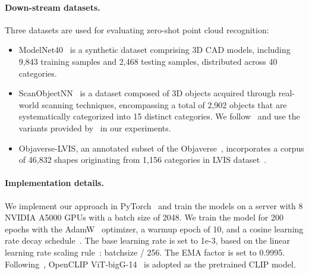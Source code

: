 \documentclass{article} \usepackage{iclr2024_conference,times}
\begin{document}
\paragraph{Down-stream datasets.}
Three datasets are used for evaluating zero-shot point cloud recognition:
\begin{itemize}[leftmargin=*,itemsep=.5ex]
\vspace{-.8em}
    \item ModelNet40~\citep{modelnet40} is a synthetic dataset comprising 3D CAD models, including 9,843 training samples and 2,468 testing samples, distributed across 40 categories.

    \item ScanObjectNN~\citep{scanobjectnn} is a dataset composed of 3D objects acquired through real-world scanning techniques, encompassing a total of 2,902 objects that are systematically categorized into 15 distinct categories. 
We follow~\citep{ulip, ulip2, openshape} and use the variants provided by~\citep{point-bert} in our experiments. 

\item Objaverse-LVIS, an annotated subset of the Objaverse~\citep{objaverse}, incorporates a corpus of 46,832 shapes originating from 1,156 categories in LVIS dataset~\citep{lvis}.
\end{itemize}

\paragraph{Implementation details.}
We implement our approach in PyTorch~\citep{pytorch} and train the models on a server with 8 NVIDIA A5000 GPUs with a batch size of 2048. 
We train the model for 200 epochs with the AdamW~\citep{AdamW} optimizer, a warmup epoch of 10, and a cosine learning rate decay schedule~\citep{cosine_lr}. 
The base learning rate is set to 1e-3, based on the linear learning rate scaling rule~\citep{linear_lr_law}:  batchsize / 256. The EMA factor is set to 0.9995. 
Following~\citet{openshape}, OpenCLIP ViT-bigG-14~\citep{openclip} is adopted as the pretrained CLIP model.
\end{document}
